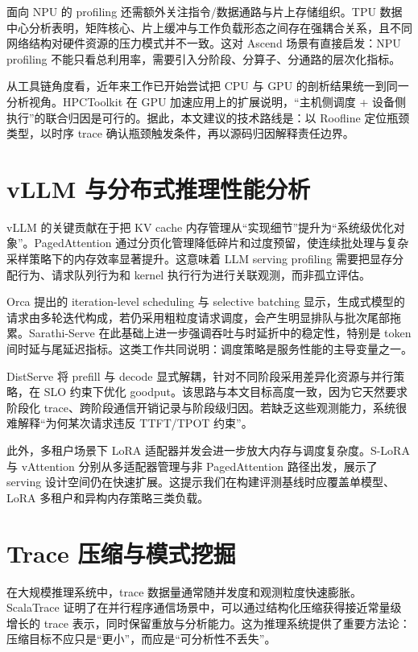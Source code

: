 \documentclass[supercite]{Experimental_Report}
\begin{document}
面向 NPU 的 profiling 还需额外关注指令/数据通路与片上存储组织。TPU 数据中心分析表明，矩阵核心、片上缓冲与工作负载形态之间存在强耦合关系，且不同网络结构对硬件资源的压力模式并不一致\cite{jouppi2017tpu}。这对 Ascend 场景有直接启发：NPU profiling 不能只看总利用率，需要引入分阶段、分算子、分通路的层次化指标。

从工具链角度看，近年来工作已开始尝试把 CPU 与 GPU 的剖析结果统一到同一分析视角。HPCToolkit 在 GPU 加速应用上的扩展说明，“主机侧调度 + 设备侧执行”的联合归因是可行的\cite{zhou2021hpctoolkitgpu}。据此，本文建议的技术路线是：以 Roofline 定位瓶颈类型，以时序 trace 确认瓶颈触发条件，再以源码归因解释责任边界。

\section{vLLM 与分布式推理性能分析}

vLLM 的关键贡献在于把 KV cache 内存管理从“实现细节”提升为“系统级优化对象”。PagedAttention 通过分页化管理降低碎片和过度预留，使连续批处理与复杂采样策略下的内存效率显著提升\cite{kwon2023pagedattention}。这意味着 LLM serving profiling 需要把显存分配行为、请求队列行为和 kernel 执行行为进行关联观测，而非孤立评估。

Orca 提出的 iteration-level scheduling 与 selective batching 显示，生成式模型的请求由多轮迭代构成，若仍采用粗粒度请求调度，会产生明显排队与批次尾部拖累\cite{yu2022orca}。Sarathi-Serve 在此基础上进一步强调吞吐与时延折中的稳定性，特别是 token 间时延与尾延迟指标\cite{agrawal2024sarathi}。这类工作共同说明：调度策略是服务性能的主导变量之一。

DistServe 将 prefill 与 decode 显式解耦，针对不同阶段采用差异化资源与并行策略，在 SLO 约束下优化 goodput\cite{zhong2024distserve}。该思路与本文目标高度一致，因为它天然要求阶段化 trace、跨阶段通信开销记录与阶段级归因。若缺乏这些观测能力，系统很难解释“为何某次请求违反 TTFT/TPOT 约束”。

此外，多租户场景下 LoRA 适配器并发会进一步放大内存与调度复杂度。S-LoRA 与 vAttention 分别从多适配器管理与非 PagedAttention 路径出发，展示了 serving 设计空间仍在快速扩展\cite{sheng2024slora,prabhu2025vattention}。这提示我们在构建评测基线时应覆盖单模型、LoRA 多租户和异构内存策略三类负载。

\section{Trace 压缩与模式挖掘}

在大规模推理系统中，trace 数据量通常随并发度和观测粒度快速膨胀。ScalaTrace 证明了在并行程序通信场景中，可以通过结构化压缩获得接近常量级增长的 trace 表示，同时保留重放与分析能力\cite{noeth2009scalatrace}。这为推理系统提供了重要方法论：压缩目标不应只是“更小”，而应是“可分析性不丢失”。
\end{document}
